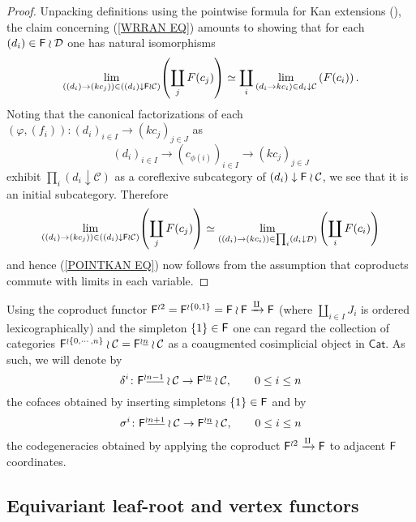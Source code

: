 \documentclass[a4paper,10pt]{article}%
\begin{document}
\begin{proof}
  Unpacking definitions using the pointwise formula for Kan extensions (\cite[X.3.1]{McL}), the claim concerning (\ref{WRRAN EQ}) amounts to showing that for each $(d_i) \in \mathsf{F} \wr \mathcal{D}$ one has natural isomorphisms
  \begin{equation}\label{POINTKAN EQ}
    \underset{((d_i) \to (kc_j))\in
      \left( (d_i) \downarrow \mathsf{F} \wr \mathcal{C} \right) }{\lim} {\left(\coprod_j{F(c_j)}\right)}
    \simeq	
    \coprod_i \underset{(d_i  \to kc_i) \in d_i \downarrow \mathcal{C}}{\lim}
    \left(F(c_i)\right).
  \end{equation}
  Noting that the canonical factorizations of each $(\varphi,(f_i))\colon (d_i)_{i \in I} \to (k c_j)_{j \in J}$ as
  \[(d_i)_{i\in I} \to (c_{\phi(i)})_{i \in I} \to (k c_j)_{j \in J}\]
  exhibit $\prod_{i}{(d_i\downarrow \mathcal{C})}$ as a coreflexive subcategory of $(d_i)\downarrow \mathsf{F} \wr \mathcal{C}$, we see that it is an initial subcategory. Therefore
  \[
  \underset{((d_i) \to (kc_j))\in
    \left( (d_i)\downarrow \mathsf{F} \wr \mathcal{C} \right) }{\lim} {\left(\coprod_j{F(c_j)}\right)}
  \simeq	
  \underset{((d_i) \to (kc_i))\in
    \prod_{i} \left( {d_i \downarrow \mathcal{D}} \right)}{\lim}
  \left(\coprod_i{F(c_i)}\right)
  \]
  and hence (\ref{POINTKAN EQ}) now follows from the assumption that coproducts commute with limits in each variable.
\end{proof}

\begin{notation}
  Using the coproduct functor $\mathsf{F}^{\wr 2} = \mathsf{F}^{\wr \{{0,1\}}} =\mathsf{F} \wr \mathsf{F} \xrightarrow{\amalg} \mathsf{F}$ (where $\coprod_{i\in I} J_i$ is ordered lexicographically) and the simpleton $\{1\} \in \mathsf{F}$
  one can regard the collection of categories 
  $\mathsf{F}^{\wr \{0,\cdots,n\}} \wr \mathcal{C} = \mathsf{F}^{\wr \underline{n}} \wr \mathcal{C}$
  as a coaugmented cosimplicial object in $\mathsf{Cat}$.
  As such, we will denote by
  \[
  \delta^i\colon \mathsf{F}^{\wr \underline{n-1}} \wr \mathcal{C} \to \mathsf{F}^{\wr \underline{n}} \wr \mathcal{C}, \qquad 0 \leq i \leq n
  \]
  the cofaces obtained by inserting simpletons $\{1\} \in \mathsf{F}$ and by 
  \[
  \sigma^i \colon \mathsf{F}^{\wr \underline{n+1}} \wr \mathcal{C} \to \mathsf{F}^{\wr \underline{n}} \wr \mathcal{C}, \qquad 0 \leq i \leq n
  \]
  the codegeneracies obtained by applying the coproduct 
  $\mathsf{F}^{\wr 2} \xrightarrow{\amalg} \mathsf{F}$ to adjacent 
  $\mathsf{F}$ coordinates.
\end{notation}



\subsection{Equivariant leaf-root and vertex functors}
\end{document}

